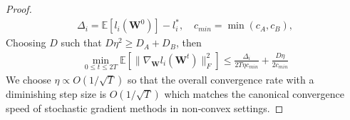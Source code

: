 \begin{proof}
\begin{align}
    \Delta_i = \mathbb{E}[l_i(\mathbf{W}^{0})] -l_i^*, \quad c_{min} = \min (c_A ,c_B), 
\end{align}
Choosing $D$ such that $D\eta^2\geq D_A+D_B$, then
\begin{align}
    \min_{0\leq t\le 2T}  \mathbb{E}[\|\nabla_{\mathbf{W}}l_i(\mathbf{W}^{t})\|_F^2] \leq \frac{ \Delta_i}{2T\eta c_{min}} + \frac{D\eta}{2  c_{min}}
\end{align}
We choose $\eta \propto O(1/\sqrt{T})$ so that the overall convergence rate with a diminishing step size is $ O(1/\sqrt{T})$ which matches the canonical convergence speed of stochastic gradient methods in non‑convex settings.
\end{proof}